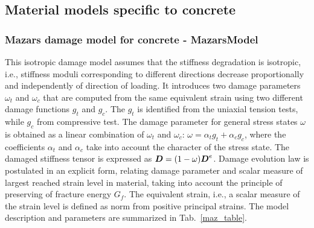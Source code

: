 \documentclass[a4paper]{article}
\newcommand{\mbf}[1]{\mbox{\boldmath$#1$}}
\begin{document}
\subsection{Material models specific to concrete}
\subsubsection{Mazars damage model for concrete - MazarsModel}
This isotropic damage model assumes that the stiffness degradation is
isotropic, i.e., stiffness moduli corresponding to different
directions decrease proportionally and independently of direction of
loading.
It introduces two damage parameters $\omega_t$ and $\omega_c$ that
are computed from the same equivalent strain using two different damage functions
$g_t$ and $g_c$. The $g_t$ is identified from the uniaxial tension tests, while
$g_c$ from compressive test. The damage parameter for general stress states
$\omega$ is obtained as a linear combination of $\omega_t$ and $\omega_c$:
$\omega=\alpha_t g_t + \alpha_c g_c$, where the coefficients
$\alpha_t$ and $\alpha_c$ take into account the character of the
stress state.
The damaged stiffness tensor is expressed as
$\mbf{D}=(1-\omega)\mbf{D}^e$.
Damage evolution law is postulated in an explicit form, relating
damage parameter and scalar measure of largest reached strain level in
material, taking into account the principle of preserving of fracture
energy $G_f$. The equivalent strain, i.e., a scalar measure of the
strain level is defined as norm from positive principal strains.
The model description and parameters are summarized
in Tab.~\ref{maz_table}.
\end{document}
